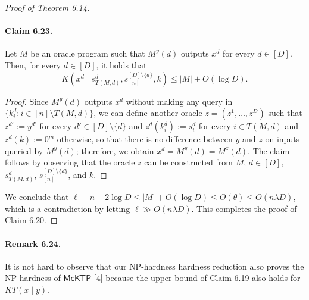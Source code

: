 \documentclass[10pt,a4paper]{article}
\begin{document}
\begin{proof}[Proof of Theorem 6.14]
\paragraph{Claim 6.23.}
Let $M$ be an oracle program such that $M^y(d)$ outputs $x^d$ for every $d\in[D]$. Then, for every $d\in[D]$, it holds that
\[K(x^d\mid s_{T(M,d)}^d,s_{[n]}^{[D]\setminus\{d\}},k)\leq|M|+O(\log D).\]
\begin{proof}
Since $M^y(d)$ outputs $x^d$ without making any query in $\{k_i^d:i\in[n]\setminus T(M,d)\}$, we can define another oracle $z=(z^1,\ldots,z^D)$ such that $z^{d'}:=y^{d'}$ for every $d'\in[D]\setminus\{d\}$ and $z^d(k_i^d):=s_i^d$ for every $i\in T(M,d)$ and $z^d(k):=0^m$ otherwise, so that there is no difference between $y$ and $z$ on inputs queried by $M^y(d)$; therefore, we obtain $x^d=M^y(d)=M^z(d)$. The claim follows by observing that the oracle $z$ can be constructed from $M$, $d\in[D]$, $s_{T(M,d)}^d$, $s_{[n]}^{[D]\setminus\{d\}}$, and $k$.
\end{proof}
We conclude that $\ell-n-2\log D\leq|M|+O(\log D)\leq O(\theta)\leq O(n\lambda D)$, which is a contradiction by letting $\ell\gg O(n\lambda D)$. This completes the proof of Claim 6.20.
\end{proof}
\paragraph{Remark 6.24.}
It is not hard to observe that our NP-hardness hardness reduction also proves the NP-hardness of $\mathsf{McKTP}$ [4] because the upper bound of Claim 6.19 also holds for $KT(x\mid y)$.
\end{document}
